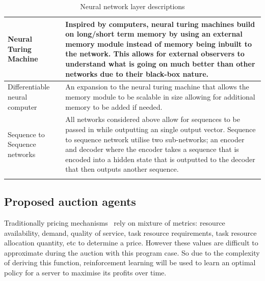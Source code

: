 \begin{longtable}{|p{3.5cm}|p{10cm}|}
    Neural Turing Machine~\citep{NTM} & Inspired by computers, neural turing machines build on long/short term memory
        by using an external memory module instead of memory being inbuilt to the network. This allows for external
        observers to understand what is going on much better than other networks due to their black-box nature. \\ \hline

    Differentiable neural computer~\citep{DNC} & An expansion to the neural turing machine that allows the memory
        module to be scalable in size allowing for additional memory to be added if needed. \\ \hline

    Sequence to Sequence networks~\cite{seq2seq} & All networks considered above allow for sequences to be passed in
        while outputting an single output vector. Sequence to sequence network utilise two sub-networks; an encoder and
        decoder where the encoder takes a sequence that is encoded into a hidden state that is outputted to the
        decoder that then outputs another sequence. \\ \hline
    \caption{Neural network layer descriptions}
    \label{tab:neural_network_layers}
\end{longtable}

\subsection{Proposed auction agents}\label{subsec:proposed-auction-agents}
Traditionally pricing mechanisms~\citep{al2013cloud} rely on mixture of metrics: resource availability, demand,
quality of service, task resource requirements, task resource allocation quantity, etc to determine a price. However
these values are difficult to approximate during the auction with this program case. So due to the complexity of
deriving this function, reinforcement learning will be used to learn an optimal policy for a server to maximise its
profits over time.


